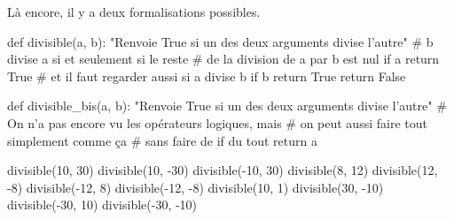 \begin{solution}
Là encore, il y a deux formalisations possibles.

\begin{idleconsole}
\begin{pyconsole}
def divisible(a, b):
    "Renvoie True si un des deux arguments divise l'autre"
    # b divise a si et seulement si le reste
    # de la division de a par b est nul
    if a %
        return True
    # et il faut regarder aussi si a divise b
    if b %
        return True
    return False

def divisible_bis(a, b):
    "Renvoie True si un des deux arguments divise l'autre"
    # On n'a pas encore vu les opérateurs logiques, mais
    # on peut aussi faire tout simplement comme ça
    # sans faire de if du tout
    return a %

divisible(10, 30)
divisible(10, -30)
divisible(-10, 30)
divisible(8, 12)
divisible(12, -8)
divisible(-12, 8)
divisible(-12, -8)
divisible(10, 1)
divisible(30, -10)
divisible(-30, 10)
divisible(-30, -10)
\end{pyconsole}
\end{idleconsole}
\end{solution}



\vspace{2pt}

